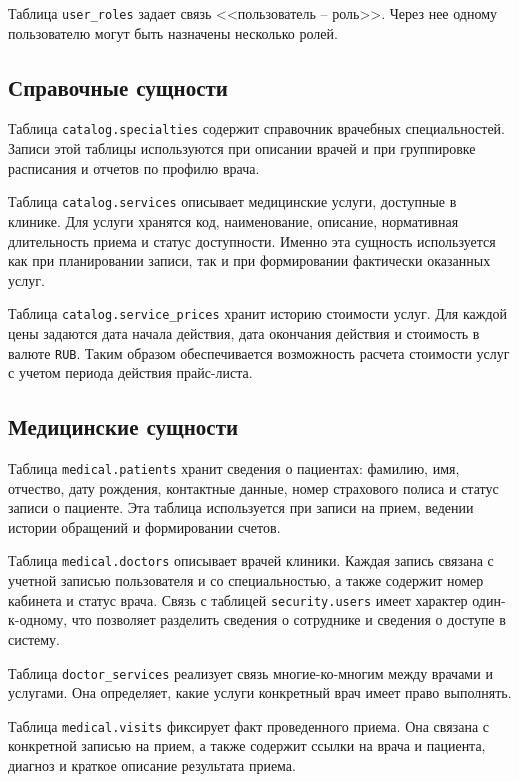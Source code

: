 Таблица \texttt{user\_roles} задает связь <<пользователь -- роль>>. Через нее одному пользователю могут быть назначены несколько ролей.

\subsection{Справочные сущности}

Таблица \texttt{catalog.specialties} содержит справочник врачебных специальностей. Записи этой таблицы используются при описании врачей и при группировке расписания и отчетов по профилю врача.

Таблица \texttt{catalog.services} описывает медицинские услуги, доступные в клинике. Для услуги хранятся код, наименование, описание, нормативная длительность приема и статус доступности. Именно эта сущность используется как при планировании записи, так и при формировании фактически оказанных услуг.

Таблица \texttt{catalog.service\_prices} хранит историю стоимости услуг. Для каждой цены задаются дата начала действия, дата окончания действия и стоимость в валюте \texttt{RUB}. Таким образом обеспечивается возможность расчета стоимости услуг с учетом периода действия прайс-листа.

\subsection{Медицинские сущности}

Таблица \texttt{medical.patients} хранит сведения о пациентах: фамилию, имя, отчество, дату рождения, контактные данные, номер страхового полиса и статус записи о пациенте. Эта таблица используется при записи на прием, ведении истории обращений и формировании счетов.

Таблица \texttt{medical.doctors} описывает врачей клиники. Каждая запись связана с учетной записью пользователя и со специальностью, а также содержит номер кабинета и статус врача. Связь с таблицей \texttt{security.users} имеет характер один-к-одному, что позволяет разделить сведения о сотруднике и сведения о доступе в систему.

Таблица \texttt{doctor\_services} реализует связь многие-ко-многим между врачами и услугами. Она определяет, какие услуги конкретный врач имеет право выполнять.

Таблица \texttt{medical.visits} фиксирует факт проведенного приема. Она связана с конкретной записью на прием, а также содержит ссылки на врача и пациента, диагноз и краткое описание результата приема.

